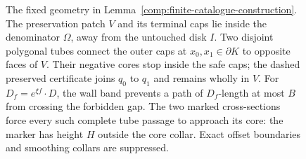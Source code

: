 \begin{figure}[tbp]
\caption{The fixed geometry in Lemma~\ref{comp:finite-catalogue-construction}.
The preservation patch $V$ and its terminal caps lie inside the denominator
$\Omega$, away from the untouched disk $I$.  Two disjoint polygonal tubes
connect the outer caps at $x_0,x_1\in\partial K$ to opposite faces of $V$.
Their negative cores stop inside the safe caps; the dashed preserved
certificate joins $q_0$ to $q_1$ and remains wholly in $V$.  For $D_f=e^{\xi f}\cdot D$, the wall
band prevents a path of $D_f$-length at most $B$ from crossing the forbidden
gap.  The two marked
cross-sections force every such complete tube passage to approach its
core: the marker has height $H$ outside the core collar.  Exact offset
boundaries and smoothing collars are suppressed.}
\label{fig:forcing-corridors}
\end{figure}
